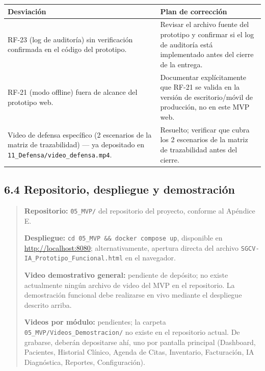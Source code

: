\documentclass[
]{article}
\newcounter{none} %
\begin{document}
{\def\LTcaptype{none} %
\begin{longtable}[]{|
  >{\raggedright\arraybackslash}p{}|
  >{\raggedright\arraybackslash}p{}|}
\hline
\begin{minipage}[b]{\linewidth}\raggedright
\textbf{Desviación}
\end{minipage} & \begin{minipage}[b]{\linewidth}\raggedright
\textbf{Plan de corrección}
\end{minipage} \\
\hline
\endhead
\hline
\endlastfoot
RF-23 (log de auditoría) sin verificación confirmada en el código del prototipo. & Revisar el archivo fuente del prototipo y confirmar si el log de auditoría está implementado antes del cierre de la entrega. \\
\hline
RF-21 (modo offline) fuera de alcance del prototipo web. & Documentar explícitamente que RF-21 se valida en la versión de escritorio/móvil de producción, no en este MVP web. \\
\hline
Video de defensa específico (2 escenarios de la matriz de trazabilidad) --- ya depositado en \texttt{11\_Defensa/video\_defensa.mp4}. & Resuelto; verificar que cubra los 2 escenarios de la matriz de trazabilidad antes del cierre. \\
\hline
\end{longtable}
}

\subsection{6.4 Repositorio, despliegue y
demostración}\label{s6-4-repositorio-despliegue-demostracion}

\begin{quote}
\textbf{Repositorio:} \texttt{05\_MVP/} del repositorio del proyecto,
conforme al Apéndice E.

\textbf{Despliegue:} \verb|cd 05_MVP && docker compose up|, disponible
en \url{http://localhost:8080}; alternativamente, apertura directa del
archivo \texttt{SGCV-IA\_Prototipo\_Funcional.html} en el navegador.

\textbf{Video demostrativo general:} pendiente de depósito; no existe
actualmente ningún archivo de video del MVP en el repositorio. La
demostración funcional debe realizarse en vivo mediante el despliegue
descrito arriba.

\textbf{Videos por módulo:} pendientes; la carpeta
\texttt{05\_MVP/Videos\_Demostracion/} no existe en el repositorio
actual. De grabarse, deberán depositarse ahí, uno por pantalla
principal (Dashboard, Pacientes, Historial Clínico, Agenda de Citas,
Inventario, Facturación, IA Diagnóstica, Reportes, Configuración).
\end{quote}
\end{document}
